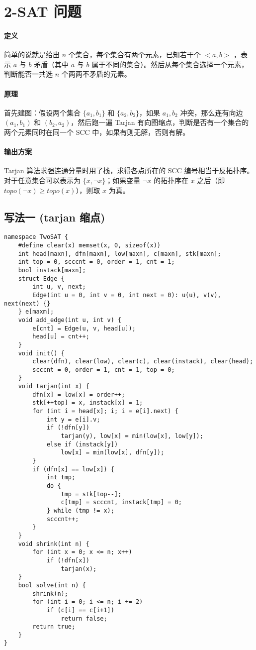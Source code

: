 \section{2-SAT 问题}

\paragraph{定义} 简单的说就是给出 $n$ 个集合，每个集合有两个元素，已知若干个 $<a, b>$ ，表示 $a$ 与 $b$ 矛盾（其中 $a$ 与 $b$ 属于不同的集合）。然后从每个集合选择一个元素，判断能否一共选 $n$ 个两两不矛盾的元素。
\paragraph{原理} 首先建图：假设两个集合 $\{a_1, b_1\}$ 和 $\{a_2, b_2\}$，如果 $a_1, b_2$ 冲突，那么连有向边 $(a_1, b_1)$ 和 $(b_2, a_2)$，然后跑一遍 Tarjan 有向图缩点，判断是否有一个集合的两个元素同时在同一个 SCC 中，如果有则无解，否则有解。
\paragraph{输出方案} Tarjan 算法求强连通分量时用了栈，求得各点所在的 SCC 编号相当于反拓扑序。对于任意集合可以表示为 $\{x, \neg x\}$；如果变量 $\neg x$ 的拓扑序在 $x$ 之后（即 $topo(\neg x) \ge topo(x)$），则取 $x$ 为真。

\subsection{写法一 (tarjan 缩点)}
\begin{verbatim}
namespace TwoSAT {
    #define clear(x) memset(x, 0, sizeof(x))
    int head[maxn], dfn[maxn], low[maxn], c[maxn], stk[maxn];
    int top = 0, scccnt = 0, order = 1, cnt = 1;
    bool instack[maxn];
    struct Edge {
        int u, v, next;
        Edge(int u = 0, int v = 0, int next = 0): u(u), v(v), next(next) {}
    } e[maxm];
    void add_edge(int u, int v) {
        e[cnt] = Edge(u, v, head[u]);
        head[u] = cnt++;
    }
    void init() {
        clear(dfn), clear(low), clear(c), clear(instack), clear(head);
        scccnt = 0, order = 1, cnt = 1, top = 0;
    }
    void tarjan(int x) {
        dfn[x] = low[x] = order++;
        stk[++top] = x, instack[x] = 1;
        for (int i = head[x]; i; i = e[i].next) {
            int y = e[i].v;
            if (!dfn[y])
                tarjan(y), low[x] = min(low[x], low[y]);
            else if (instack[y])
                low[x] = min(low[x], dfn[y]);
        }
        if (dfn[x] == low[x]) {
            int tmp;
            do {
                tmp = stk[top--];
                c[tmp] = scccnt, instack[tmp] = 0;
            } while (tmp != x);
            scccnt++;
        }
    }
    void shrink(int n) {
        for (int x = 0; x <= n; x++)
            if (!dfn[x])
                tarjan(x);
    }
    bool solve(int n) {
        shrink(n);
        for (int i = 0; i <= n; i += 2)
            if (c[i] == c[i+1])
                return false;
        return true;
    }
}
\end{verbatim}

